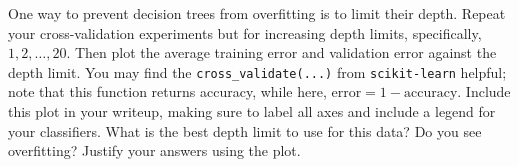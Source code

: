 \documentclass[11pt]{article}
\begin{document}
\begin{enumerate}[resume]
One way to prevent decision trees from overfitting is to limit their depth. Repeat your cross-validation experiments but for increasing depth limits, specifically, $1,2,\ldots,20$. Then plot the average training error and validation error against the depth limit. You may find the \verb|cross_validate(...)| from \verb|scikit-learn| helpful; note that this function returns accuracy, while here, $\text{error} = 1 - \text{accuracy}$.
Include this plot in your writeup, making sure to label all axes and include a legend for your classifiers. What is the best depth limit to use for this data? Do you see overfitting? Justify your answers using the plot. 


\end{enumerate}
\end{document}
